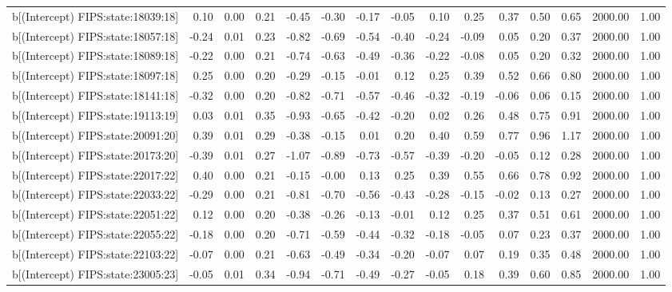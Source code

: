 \begin{table}[ht]
\begin{tabular}{rrrrrrrrrrrrrrr}
  b[(Intercept) FIPS:state:18039:18] & 0.10 & 0.00 & 0.21 & -0.45 & -0.30 & -0.17 & -0.05 & 0.10 & 0.25 & 0.37 & 0.50 & 0.65 & 2000.00 & 1.00 \\ 
  b[(Intercept) FIPS:state:18057:18] & -0.24 & 0.01 & 0.23 & -0.82 & -0.69 & -0.54 & -0.40 & -0.24 & -0.09 & 0.05 & 0.20 & 0.37 & 2000.00 & 1.00 \\ 
  b[(Intercept) FIPS:state:18089:18] & -0.22 & 0.00 & 0.21 & -0.74 & -0.63 & -0.49 & -0.36 & -0.22 & -0.08 & 0.05 & 0.20 & 0.32 & 2000.00 & 1.00 \\ 
  b[(Intercept) FIPS:state:18097:18] & 0.25 & 0.00 & 0.20 & -0.29 & -0.15 & -0.01 & 0.12 & 0.25 & 0.39 & 0.52 & 0.66 & 0.80 & 2000.00 & 1.00 \\ 
  b[(Intercept) FIPS:state:18141:18] & -0.32 & 0.00 & 0.20 & -0.82 & -0.71 & -0.57 & -0.46 & -0.32 & -0.19 & -0.06 & 0.06 & 0.15 & 2000.00 & 1.00 \\ 
  b[(Intercept) FIPS:state:19113:19] & 0.03 & 0.01 & 0.35 & -0.93 & -0.65 & -0.42 & -0.20 & 0.02 & 0.26 & 0.48 & 0.75 & 0.91 & 2000.00 & 1.00 \\ 
  b[(Intercept) FIPS:state:20091:20] & 0.39 & 0.01 & 0.29 & -0.38 & -0.15 & 0.01 & 0.20 & 0.40 & 0.59 & 0.77 & 0.96 & 1.17 & 2000.00 & 1.00 \\ 
  b[(Intercept) FIPS:state:20173:20] & -0.39 & 0.01 & 0.27 & -1.07 & -0.89 & -0.73 & -0.57 & -0.39 & -0.20 & -0.05 & 0.12 & 0.28 & 2000.00 & 1.00 \\ 
  b[(Intercept) FIPS:state:22017:22] & 0.40 & 0.00 & 0.21 & -0.15 & -0.00 & 0.13 & 0.25 & 0.39 & 0.55 & 0.66 & 0.78 & 0.92 & 2000.00 & 1.00 \\ 
  b[(Intercept) FIPS:state:22033:22] & -0.29 & 0.00 & 0.21 & -0.81 & -0.70 & -0.56 & -0.43 & -0.28 & -0.15 & -0.02 & 0.13 & 0.27 & 2000.00 & 1.00 \\ 
  b[(Intercept) FIPS:state:22051:22] & 0.12 & 0.00 & 0.20 & -0.38 & -0.26 & -0.13 & -0.01 & 0.12 & 0.25 & 0.37 & 0.51 & 0.61 & 2000.00 & 1.00 \\ 
  b[(Intercept) FIPS:state:22055:22] & -0.18 & 0.00 & 0.20 & -0.71 & -0.59 & -0.44 & -0.32 & -0.18 & -0.05 & 0.07 & 0.23 & 0.37 & 2000.00 & 1.00 \\ 
  b[(Intercept) FIPS:state:22103:22] & -0.07 & 0.00 & 0.21 & -0.63 & -0.49 & -0.34 & -0.20 & -0.07 & 0.07 & 0.19 & 0.35 & 0.48 & 2000.00 & 1.00 \\ 
  b[(Intercept) FIPS:state:23005:23] & -0.05 & 0.01 & 0.34 & -0.94 & -0.71 & -0.49 & -0.27 & -0.05 & 0.18 & 0.39 & 0.60 & 0.85 & 2000.00 & 1.00 \\ 

\end{tabular}
\end{table}
